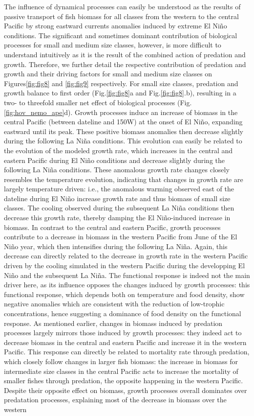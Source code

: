 The influence of dynamical processes can easily be understood as the results of passive transport of fish biomass for all classes from the western to the central Pacific by strong eastward currents anomalies induced by extreme El Niño conditions. The significant and sometimes dominant contribution of biological processes for small and medium size classes, however, is more difficult to understand intuitively as it is the result of the combined action of predation and growth. Therefore, we further detail the respective contribution of predation and growth and their driving factors for small and medium size classes on Figures\ref{fig:fig8} and \ref{fig:fig9} respectively. For small size classes, predation and growth balance to first order (Fig.\ref{fig:fig8}a and Fig.\ref{fig:fig8}.b), resulting in a two- to threefold smaller net effect of biological processes (Fig. \ref{fig:hov_nemo_ape}d). Growth processes induce an increase  of biomass in the central Pacific (between dateline and 150\degree{}W) at the onset of El Niño, expanding eastward until its peak. These positive biomass anomalies then decrease slightly during the following La Niña conditions. This evolution can easily be related to the evolution of the modeled growth rate, which increases in the central and eastern Pacific during El Niño conditions and decrease slightly during the following La Niña conditions. These anomalous growth rate changes closely resembles the temperature evolution, indicating that changes in growth rate are largely temperature driven: i.e., the anomalous warming observed east of the dateline during El Niño increase growth rate and thus biomass of small size classes. The cooling observed during the subsequent La Niña conditions then decrease this growth rate, thereby damping the El Niño-induced increase in biomass. In contrast to the central and eastern Pacific, growth processes contribute to a decrease in biomass in the western Pacific from June of the El Niño year, which then intensifies during the following La Niña. Again, this decrease can directly related to the decrease in growth rate in the western Pacific driven by the cooling simulated in the western Pacific during the developping El Niño and the subsequent La Niña. The functional response is indeed not the main driver here, as its influence opposes the changes induced by growth processes: this functional response, which depends both on temperature and food density, show negative anomalies which are consistent with the reduction of low-trophic concentrations, hence suggesting a dominance of food density on the functional response. As mentioned earlier, changes in biomass induced by predation processes largely mirrors those induced by growth processes: they indeed act to decrease biomass in the central and eastern Pacific and increase it in the western Pacific. This response can directly be related to mortality rate through predation, which closely follow changes in larger fish biomass: the increase in biomass for intermediate size classes in the central Pacific acts to increase the mortality of smaller fishes through predation, the opposite happening in the western Pacific. Despite their opposite effect on biomass, growth processes overall dominates over predatation processes, explaining most of the decrease in biomass over the western 